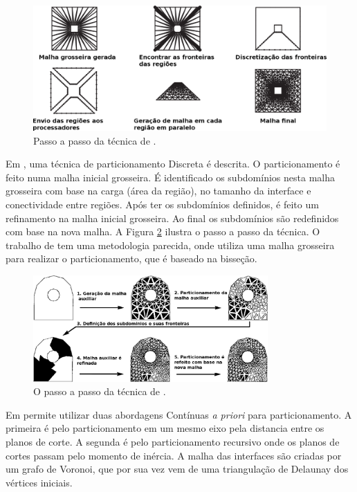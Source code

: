  
 \begin{figure}[htbp]
     \centering
     \includegraphics[width=1.0\textwidth]{fig/gaither.png}
     \caption{Passo a passo da técnica de \cite{bib:GAITHER96}.}
     \label{fig:gaither}
 \end{figure} 

 
 Em \cite{bib:WU96}, uma técnica de particionamento Discreta é descrita. O particionamento é feito numa malha inicial grosseira. É identificado os subdomínios nesta malha grosseira com base na carga (área da região), no tamanho da interface e conectividade entre regiões. Após ter os subdomínios definidos, é feito um refinamento na malha inicial grosseira. Ao final os subdomínios são redefinidos com base na nova malha. A Figura \ref{fig:wu} ilustra o passo a passo da técnica. O trabalho de \cite{bib:BANK05} tem uma metodologia parecida, onde utiliza uma malha grosseira para realizar o particionamento, que é baseado na bisseção. 
 
 \begin{figure}[htbp]
     \centering
     \includegraphics[width=0.8\textwidth]{fig/wu.png}
     \caption{O passo a passo da técnica de \cite{bib:WU96}.}
     \label{fig:wu}
 \end{figure}  

 
Em \cite{bib:GALTIER96} permite utilizar duas abordagens Contínuas \textit{a priori} para particionamento. A primeira é pelo particionamento em um mesmo eixo pela distancia entre os planos de corte. A segunda é pelo particionamento recursivo onde os planos de cortes passam pelo momento de inércia. A malha das interfaces são criadas por um grafo de Voronoi, que por sua vez vem de uma triangulação de Delaunay dos vértices iniciais.
 


